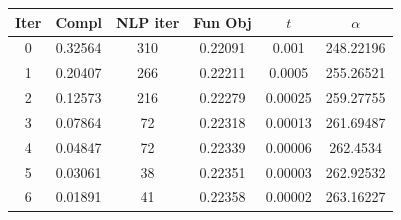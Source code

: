 \begin{tabular}{c c c c c c}
\toprule
Iter & Compl & NLP iter & Fun Obj & $t$ & $\alpha$ \\
\midrule
0 & 0.32564 & 310 & 0.22091 & 0.001 & 248.22196 \\
1 & 0.20407 & 266 & 0.22211 & 0.0005 & 255.26521 \\
2 & 0.12573 & 216 & 0.22279 & 0.00025 & 259.27755 \\
3 & 0.07864 & 72 & 0.22318 & 0.00013 & 261.69487 \\
4 & 0.04847 & 72 & 0.22339 & 0.00006 & 262.4534 \\
5 & 0.03061 & 38 & 0.22351 & 0.00003 & 262.92532 \\
6 & 0.01891 & 41 & 0.22358 & 0.00002 & 263.16227 \\
\bottomrule
\end{tabular}